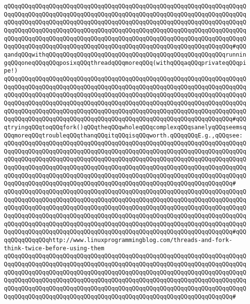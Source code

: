 \verb|qQQqqQQqqQQqqQQqqQQqqQQqqQQqqQQqqQQqqQQqqQQqqQQqqQQqqQQqqQQqqQQqqQQqqQQqqQQqqQQqqQQqqQQqqQQqqQQqqQQqqQQqqQQqqQQqqQQqqQQqqQQqqQQqqQQqqQQqqQQqqQQqqQQqqQQqqQQqqQQqqQQqqQQqqQQqqQQqqQQqqQQqqQQqqQQqqQQqqQQqqQQqqQQqqQQqqQQqqQQqqQQqqQQqqQQqqQQqqQQqqQQqqQQqqQQqqQQqqQQqqQQqqQQqqQQqqQQqqQQqqQQqqQQqqQQqqQQqqQQqqQQqqQQqqQQqqQQqqQQqqQQqqQQqqQQqqQQqqQQqqQQqqQQqqQQqqQQqqQQqqQQqqQQqqQQqqQQqqQQqqQQqqQQqqQQqqQQqqQQqqQQqqQQqqQQqqQQq#qQQqandqQQqwithqQQqqQQqqQQq|\verb|qQQqqQQqqQQqqQQqqQQqqQQqqQQqqQQqqQQqqQQqrunningqQQqoneqQQqqQQqposixqQQqthreadqQQqmoreqQQq(withqQQqaqQQqprivateqQQqpipe!)|\newline
\verb|qQQqqQQqqQQqqQQqqQQqqQQqqQQqqQQqqQQqqQQqqQQqqQQqqQQqqQQqqQQqqQQqqQQqqQQqqQQqqQQqqQQqqQQqqQQqqQQqqQQqqQQqqQQqqQQqqQQqqQQqqQQqqQQqqQQqqQQqqQQqqQQqqQQqqQQqqQQqqQQqqQQqqQQqqQQqqQQqqQQqqQQqqQQqqQQqqQQqqQQqqQQqqQQqqQQqqQQqqQQqqQQqqQQqqQQqqQQqqQQqqQQqqQQqqQQqqQQqqQQqqQQqqQQqqQQqqQQqqQQqqQQqqQQqqQQqqQQqqQQqqQQqqQQqqQQqqQQqqQQqqQQqqQQqqQQqqQQqqQQqqQQqqQQqqQQqqQQqqQQqqQQqqQQqqQQqqQQqqQQqqQQqqQQqqQQqqQQqqQQqqQQqqQQqqQQqqQQq#qQQqtryingqQQqtoqQQqfork()qQQqtheqQQqwholeqQQqcomplexqQQqsanelyqQQqseemsqQQqmoreqQQqtroubleqQQqthanqQQqitqQQqisqQQqworth.qQQqqQQqE.g.,qQQqsee:|\newline
\verb|qQQqqQQqqQQqqQQqqQQqqQQqqQQqqQQqqQQqqQQqqQQqqQQqqQQqqQQqqQQqqQQqqQQqqQQqqQQqqQQqqQQqqQQqqQQqqQQqqQQqqQQqqQQqqQQqqQQqqQQqqQQqqQQqqQQqqQQqqQQqqQQqqQQqqQQqqQQqqQQqqQQqqQQqqQQqqQQqqQQqqQQqqQQqqQQqqQQqqQQqqQQqqQQqqQQqqQQqqQQqqQQqqQQqqQQqqQQqqQQqqQQqqQQqqQQqqQQqqQQqqQQqqQQqqQQqqQQqqQQqqQQqqQQqqQQqqQQqqQQqqQQqqQQqqQQqqQQqqQQqqQQqqQQqqQQqqQQqqQQqqQQqqQQqqQQqqQQqqQQqqQQqqQQqqQQqqQQqqQQqqQQqqQQqqQQqqQQqqQQqqQQqqQQqqQQqqQQq#|\newline
\verb|qQQqqQQqqQQqqQQqqQQqqQQqqQQqqQQqqQQqqQQqqQQqqQQqqQQqqQQqqQQqqQQqqQQqqQQqqQQqqQQqqQQqqQQqqQQqqQQqqQQqqQQqqQQqqQQqqQQqqQQqqQQqqQQqqQQqqQQqqQQqqQQqqQQqqQQqqQQqqQQqqQQqqQQqqQQqqQQqqQQqqQQqqQQqqQQqqQQqqQQqqQQqqQQqqQQqqQQqqQQqqQQqqQQqqQQqqQQqqQQqqQQqqQQqqQQqqQQqqQQqqQQqqQQqqQQqqQQqqQQqqQQqqQQqqQQqqQQqqQQqqQQqqQQqqQQqqQQqqQQqqQQqqQQqqQQqqQQqqQQqqQQqqQQqqQQqqQQqqQQqqQQqqQQqqQQqqQQqqQQqqQQqqQQqqQQqqQQqqQQqqQQqqQQqqQQqqQQq#qQQqqQQqqQQqqQQqhttp://www.linuxprogrammingblog.com/threads-and-fork-think-twice-before-using-them|\newline
\verb|qQQqqQQqqQQqqQQqqQQqqQQqqQQqqQQqqQQqqQQqqQQqqQQqqQQqqQQqqQQqqQQqqQQqqQQqqQQqqQQqqQQqqQQqqQQqqQQqqQQqqQQqqQQqqQQqqQQqqQQqqQQqqQQqqQQqqQQqqQQqqQQqqQQqqQQqqQQqqQQqqQQqqQQqqQQqqQQqqQQqqQQqqQQqqQQqqQQqqQQqqQQqqQQqqQQqqQQqqQQqqQQqqQQqqQQqqQQqqQQqqQQqqQQqqQQqqQQqqQQqqQQqqQQqqQQqqQQqqQQqqQQqqQQqqQQqqQQqqQQqqQQqqQQqqQQqqQQqqQQqqQQqqQQqqQQqqQQqqQQqqQQqqQQqqQQqqQQqqQQqqQQqqQQqqQQqqQQqqQQqqQQqqQQqqQQqqQQqqQQqqQQqqQQqqQQqqQQq#|\newline
